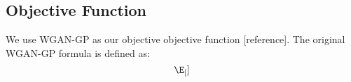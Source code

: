 \subsection{Objective Function}
We use WGAN-GP as our objective objective function [reference]. The original WGAN-GP formula is defined as:
\begin{equation}
\E_[]
\end{equation}